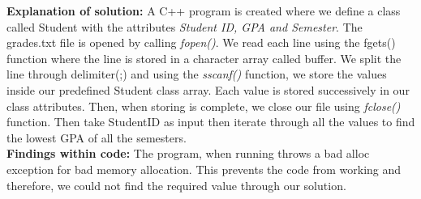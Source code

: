\documentclass[a4paper, left=1in, right=1in,12pt]{article}
\begin{document}
\textbf{Explanation of solution: }A C++ program is created where we define a class called Student with the attributes \textit{Student ID, GPA and Semester}. The grades.txt file is opened by calling \textit{fopen()}. We read each line using the fgets() function where the line is stored in a character array called buffer. We split the line through delimiter(;)  and using the \textit{sscanf()} function, we store the values inside our predefined Student class array. Each value is stored successively in our class attributes.
Then, when storing is complete, we close our file using \textit{fclose()} function. Then take StudentID as input then iterate through all the values to find the lowest GPA of all the semesters. \\
\newline
\textbf{Findings within code: }The program, when running throws a bad alloc exception for bad memory allocation. This prevents the code from working and therefore, we could not find the required value through our solution.
\newline
\end{document}
